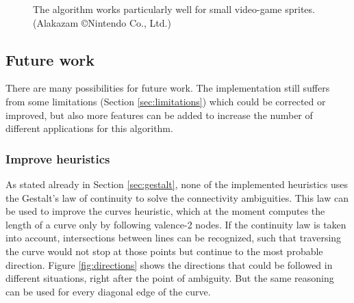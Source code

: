 \documentclass[]{usiinfbachelorproject}
\begin{document}
\begin{figure}[ht]
	\centering
	\caption{The algorithm works particularly well for small video-game sprites. (Alakazam \copyright Nintendo Co., Ltd.)}
	\label{fig:alakazam}
\end{figure}

\subsection{Future work} \label{sec:future}

There are many possibilities for future work. The implementation still suffers from some limitations (Section \ref{sec:limitations}) which could be corrected or improved, but also more features can be added to increase the number of different applications for this algorithm.

\subsubsection{Improve heuristics} 

As stated already in Section \ref{sec:gestalt}, none of the implemented heuristics uses the Gestalt's law of continuity to solve the connectivity ambiguities. This law can be used to improve the curves heuristic, which at the moment computes the length of a curve only by following valence-2 nodes. If the continuity law is taken into account, intersections between lines can be recognized, such that traversing the curve would not stop at those points but continue to the most probable direction. Figure \ref{fig:directions} shows the directions that could be followed in different situations, right after the point of ambiguity. But the same reasoning can be used for every diagonal edge of the curve.
\end{document}
